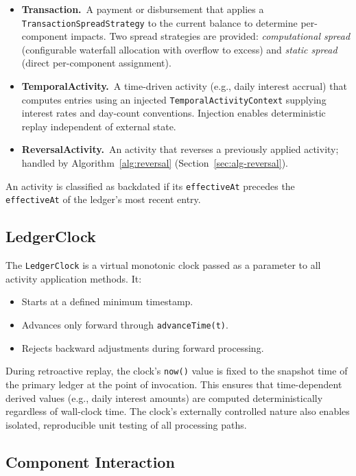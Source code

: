 \documentclass[11pt,letterpaper]{article}
\begin{document}
\begin{itemize}
  \item \textbf{Transaction.}~A payment or disbursement that applies a
        \texttt{TransactionSpreadStrategy} to the current balance to
        determine per-component impacts. Two spread strategies are
        provided: \emph{computational spread} (configurable waterfall
        allocation with overflow to excess) and \emph{static spread}
        (direct per-component assignment).
  \item \textbf{TemporalActivity.}~A time-driven activity
        (e.g., daily interest accrual) that computes entries using an
        injected \texttt{TemporalActivityContext} supplying interest
        rates and day-count conventions. Injection enables deterministic
        replay independent of external state.
  \item \textbf{ReversalActivity.}~An activity that reverses a
        previously applied activity; handled by
        Algorithm~\ref{alg:reversal} (Section~\ref{sec:alg-reversal}).
\end{itemize}

An activity is classified as backdated if its \texttt{effectiveAt}
precedes the \texttt{effectiveAt} of the ledger's most recent entry.

\subsection{LedgerClock}

The \texttt{LedgerClock} is a virtual monotonic clock passed as a
parameter to all activity application methods. It:
\begin{itemize}
  \item Starts at a defined minimum timestamp.
  \item Advances only forward through \texttt{advanceTime(t)}.
  \item Rejects backward adjustments during forward processing.
\end{itemize}

During retroactive replay, the clock's \texttt{now()} value is fixed to
the snapshot time of the primary ledger at the point of invocation.
This ensures that time-dependent derived values (e.g., daily interest
amounts) are computed deterministically regardless of wall-clock time.
The clock's externally controlled nature also enables isolated,
reproducible unit testing of all processing paths.

\subsection{Component Interaction}
\end{document}
